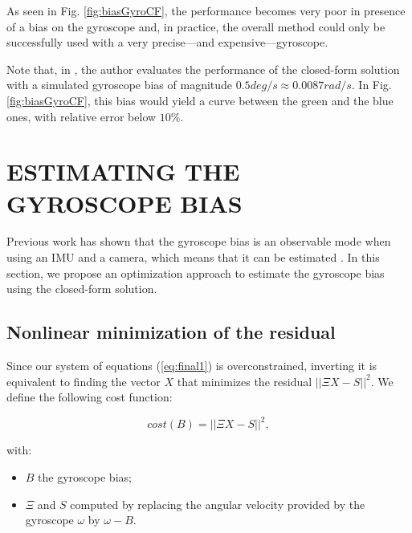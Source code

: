 \documentclass[letterpaper, 10pt, conference, final]{ieeeconf}  %
\begin{document}
As seen in Fig. \ref{fig:biasGyroCF}, the performance becomes very poor in presence of a bias on the gyroscope and, in practice, the overall method could only be successfully used with a very precise---and expensive---gyroscope.

Note that, in \cite{Martinelli2014}, the author evaluates the performance of the closed-form solution with a simulated gyroscope bias of magnitude $0.5deg/s \approx 0.0087 rad/s$.
In Fig. \ref{fig:biasGyroCF}, this bias would yield a curve between the green and the blue ones, with relative error below $10\%$.



\section{ESTIMATING THE GYROSCOPE BIAS}\label{SectionCalibration}

Previous work has shown that the gyroscope bias is an observable mode when using an IMU and a camera, which means that it can be estimated \cite{Martinelli2012}.
In this section, we propose an optimization approach to estimate the gyroscope bias using the closed-form solution.

%


\subsection{Nonlinear minimization of the residual}

Since our system of equations (\ref{eq:final1}) is overconstrained,
inverting it is equivalent to finding the vector $X$ that minimizes the residual $||\Xi X - S||^2$.
We define the following cost function:

\begin{equation}
  \label{eq:cost}
  cost(B) = ||\Xi X - S||^2,
\end{equation}

\noindent with:
\begin{itemize}
\item $B$ the gyroscope bias;
\item $\Xi$ and $S$ computed by replacing the angular velocity provided by the gyroscope $\omega$ by $\omega - B$.
\end{itemize}
\end{document}

